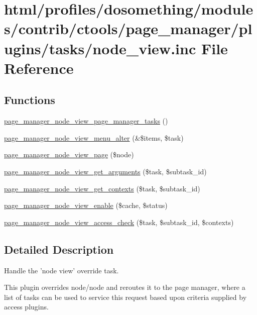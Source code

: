 \hypertarget{node__view_8inc}{
\section{html/profiles/dosomething/modules/contrib/ctools/page\_\-manager/plugins/tasks/node\_\-view.inc File Reference}
\label{node__view_8inc}
}
\subsection*{Functions}
\begin{DoxyCompactItemize}
\item 
\hyperlink{node__view_8inc_a981d1e2a2df349abcc15a7854063d01a}{page\_\-manager\_\-node\_\-view\_\-page\_\-manager\_\-tasks} ()
\item 
\hyperlink{node__view_8inc_a58c036f15927080f060f279aefcee5d6}{page\_\-manager\_\-node\_\-view\_\-menu\_\-alter} (\&\$items, \$task)
\item 
\hyperlink{node__view_8inc_adf9f4dd87820e4d5e41eb5132e693d05}{page\_\-manager\_\-node\_\-view\_\-page} (\$node)
\item 
\hyperlink{node__view_8inc_a510f191ee5d56d0d4b6d7736ccf23a81}{page\_\-manager\_\-node\_\-view\_\-get\_\-arguments} (\$task, \$subtask\_\-id)
\item 
\hyperlink{node__view_8inc_a0eaeb501a26ea68572251645a15bcc19}{page\_\-manager\_\-node\_\-view\_\-get\_\-contexts} (\$task, \$subtask\_\-id)
\item 
\hyperlink{node__view_8inc_aff295e14702bf8bd43e4b7911ae30360}{page\_\-manager\_\-node\_\-view\_\-enable} (\$cache, \$status)
\item 
\hyperlink{node__view_8inc_a7df7b4deae90b75a224830a8a30ea3bb}{page\_\-manager\_\-node\_\-view\_\-access\_\-check} (\$task, \$subtask\_\-id, \$contexts)
\end{DoxyCompactItemize}


\subsection{Detailed Description}
Handle the 'node view' override task.

This plugin overrides node/node and reroutes it to the page manager, where a list of tasks can be used to service this request based upon criteria supplied by access plugins. 

